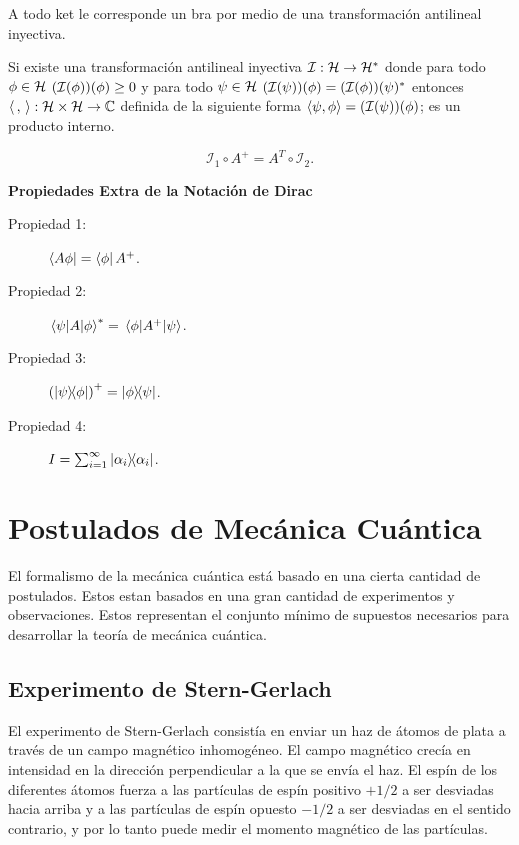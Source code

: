 \begin{tcolorbox}
	A todo ket le corresponde un bra por medio de una transformación antilineal inyectiva.
\end{tcolorbox}


\begin{teorema}
	Si existe una transformación antilineal inyectiva $\mathcal{I}:\mathcal{H} \to \mathcal{H} ^*$ donde para todo $\phi \in \mathcal{H}$ $\qty(\mathcal{I}(\phi)) (\phi) \geq 0$ y para todo $\psi \in \mathcal{H}$ $\qty(\mathcal{I} (\psi)) (\phi) = \qty(\mathcal{I} (\phi)) (\psi) ^*$ entonces $\langle \, , \, \rangle : \mathcal{H} \times \mathcal{H} \to \mathbb{C}$ definida de la siguiente forma $\langle \psi , \phi \rangle = \qty(\mathcal{I} (\psi)) (\phi)$; es un producto interno.
\end{teorema}


\begin{teorema}
	$$ \mathcal{I} _1 \circ A^+ = A^T \circ \mathcal{I}_2. $$
\end{teorema}


\textbf{Propiedades Extra de la Notación de Dirac}

\begin{description}
	\item[Propiedad 1: ] $\bra{A\phi} = \bra{\phi} A^+$.
	\item[Propiedad 2: ] $\mel{\psi}{A}{\phi} ^* = \mel{\phi}{A^+}{\psi}$.
	\item[Propiedad 3: ] $\qty(\ketbra{\psi}{\phi})^+ = \ketbra{\phi}{\psi}$.
	\item[Propiedad 4: ] $I = \sum _{i=1} ^\infty \ketbra{\alpha _i}$.
\end{description}



\chapter{Postulados de Mecánica Cuántica}
El formalismo de la mecánica cuántica está basado en una cierta cantidad de postulados. Estos estan basados en una gran cantidad de experimentos y observaciones. Estos representan el conjunto mínimo de supuestos necesarios para desarrollar la teoría de mecánica cuántica.


\section{Experimento de Stern-Gerlach}
El experimento de Stern-Gerlach consistía en enviar un haz de átomos de plata a través de un campo magnético inhomogéneo. El campo magnético crecía en intensidad en la dirección perpendicular a la que se envía el haz. El espín de los diferentes átomos fuerza a las partículas de espín positivo $+1/2$ a ser desviadas hacia arriba y a las partículas de espín opuesto $-1/2$ a ser desviadas en el sentido contrario, y por lo tanto puede medir el momento magnético de las partículas.

